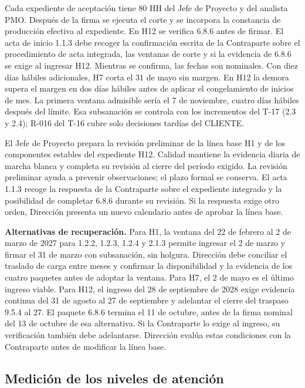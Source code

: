 Cada expediente de aceptación tiene 80 HH del Jefe de Proyecto y del analista PMO. Después de la firma se ejecuta el corte y se incorpora la constancia de producción efectiva al expediente. En H12 se verifica 6.8.6 antes de firmar. El acta de inicio 1.1.3 debe recoger la confirmación escrita de la Contraparte sobre el procedimiento de acta integrada, las ventanas de corte y si la evidencia de 6.8.6 se exige al ingresar H12. Mientras se confirma, las fechas son nominales. Con diez días hábiles adicionales, H7 corta el 31 de mayo sin margen. En H12 la demora supera el margen en dos días hábiles antes de aplicar el congelamiento de inicios de mes. La primera ventana admisible sería el 7 de noviembre, cuatro días hábiles después del límite. Esa subsanación se controla con los incrementos del T-17 (2.3 y 2.4); R-016 del T-16 cubre solo decisiones tardías del CLIENTE.


El Jefe de Proyecto prepara la revisión preliminar de la línea base H1 y de los componentes estables del expediente H12. Calidad mantiene la evidencia diaria de marcha blanca y completa su revisión al cierre del período exigido. La revisión preliminar ayuda a prevenir observaciones; el plazo formal se conserva. El acta 1.1.3 recoge la respuesta de la Contraparte sobre el expediente integrado y la posibilidad de completar 6.8.6 durante su revisión. Si la respuesta exige otro orden, Dirección presenta un nuevo calendario antes de aprobar la línea base.

\textbf{Alternativas de recuperación.} Para H1, la ventana del 22 de febrero al 2 de marzo de 2027 para 1.2.2, 1.2.3, 1.2.4 y 2.1.3 permite ingresar el 2 de marzo y firmar el 31 de marzo con subsanación, sin holgura. Dirección debe conciliar el traslado de carga entre meses y confirmar la disponibilidad y la evidencia de los cuatro paquetes antes de adoptar la ventana. Para H7, el 2 de mayo es el último ingreso viable. Para H12, el ingreso del 28 de septiembre de 2028 exige evidencia continua del 31 de agosto al 27 de septiembre y adelantar el cierre del traspaso 9.5.4 al 27. El paquete 6.8.6 termina el 11 de octubre, antes de la firma nominal del 13 de octubre de esa alternativa. Si la Contraparte lo exige al ingreso, su verificación también debe adelantarse. Dirección evalúa estas condiciones con la Contraparte antes de modificar la línea base.

\subsection{Medición de los niveles de atención}

